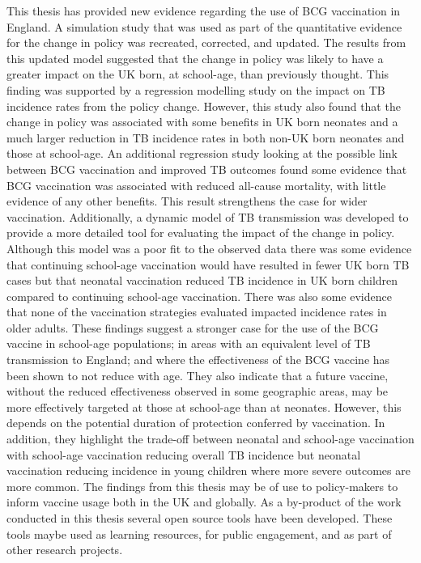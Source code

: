 \documentclass[11pt,twoside]{bristolthesis}
\begin{document}
  This thesis has provided new evidence regarding the use of BCG vaccination in England. A simulation study that was used as part of the quantitative evidence for the change in policy was recreated, corrected, and updated. The results from this updated model suggested that the change in policy was likely to have a greater impact on the UK born, at school-age, than previously thought. This finding was supported by a regression modelling study on the impact on TB incidence rates from the policy change. However, this study also found that the change in policy was associated with some benefits in UK born neonates and a much larger reduction in TB incidence rates in both non-UK born neonates and those at school-age. An additional regression study looking at the possible link between BCG vaccination and improved TB outcomes found some evidence that BCG vaccination was associated with reduced all-cause mortality, with little evidence of any other benefits. This result strengthens the case for wider vaccination. Additionally, a dynamic model of TB transmission was developed to provide a more detailed tool for evaluating the impact of the change in policy. Although this model was a poor fit to the observed data there was some evidence that continuing school-age vaccination would have resulted in fewer UK born TB cases but that neonatal vaccination reduced TB incidence in UK born children compared to continuing school-age vaccination. There was also some evidence that none of the vaccination strategies evaluated impacted incidence rates in older adults. These findings suggest a stronger case for the use of the BCG vaccine in school-age populations; in areas with an equivalent level of TB transmission to England; and where the effectiveness of the BCG vaccine has been shown to not reduce with age. They also indicate that a future vaccine, without the reduced effectiveness observed in some geographic areas, may be more effectively targeted at those at school-age than at neonates. However, this depends on the potential duration of protection conferred by vaccination. In addition, they highlight the trade-off between neonatal and school-age vaccination with school-age vaccination reducing overall TB incidence but neonatal vaccination reducing incidence in young children where more severe outcomes are more common. The findings from this thesis may be of use to policy-makers to inform vaccine usage both in the UK and globally. As a by-product of the work conducted in this thesis several open source tools have been developed. These tools maybe used as learning resources, for public engagement, and as part of other research projects.
  
\end{document}
